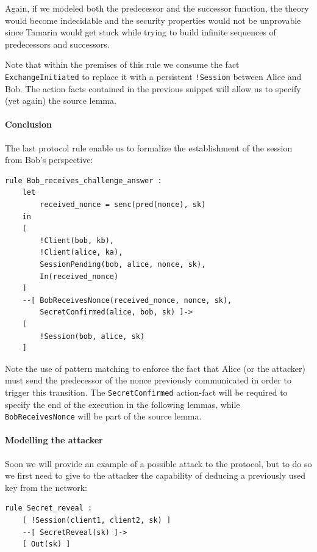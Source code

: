 \documentclass[fleqn,10pt]{SelfArx} %
\begin{document}
Again, if we modeled both the predecessor and the successor function, the theory would become indecidable and the security properties would not be unprovable since Tamarin would get stuck while trying to build infinite sequences of predecessors and successors.

Note that within the premises of this rule we consume the fact \lstinline|ExchangeInitiated| to replace it with a persistent \lstinline|!Session| between Alice and Bob. The action facts contained in the previous snippet will allow us to specify (yet again) the source lemma.

\paragraph{Conclusion}

The last protocol rule enable us to formalize the establishment of the session from Bob's perspective:

\begin{lstlisting}[language=Tamarin]
rule Bob_receives_challenge_answer :
    let
        received_nonce = senc(pred(nonce), sk)
    in
    [
        !Client(bob, kb),
        !Client(alice, ka),
        SessionPending(bob, alice, nonce, sk),
        In(received_nonce)
    ]
    --[ BobReceivesNonce(received_nonce, nonce, sk),
        SecretConfirmed(alice, bob, sk) ]->
    [
        !Session(bob, alice, sk)
    ]
\end{lstlisting}

Note the use of pattern matching to enforce the fact that Alice (or the attacker) must send the predecessor of the nonce previously communicated in order to trigger this transition. The \lstinline|SecretConfirmed| action-fact will be required to specify the end of the execution in the following lemmas, while \lstinline|BobReceivesNonce| will be part of the source lemma.

\paragraph{Modelling the attacker}

Soon we will provide an example of a possible attack to the protocol, but to do so we first need to give to the attacker the capability of deducing a previously used key from the network:

\begin{lstlisting}[language=Tamarin]
rule Secret_reveal :
    [ !Session(client1, client2, sk) ]
    --[ SecretReveal(sk) ]->
    [ Out(sk) ]
\end{lstlisting}
\end{document}
